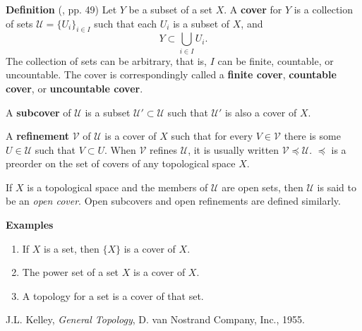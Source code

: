 \documentclass{article}
\begin{document}
{\bf Definition} (\cite{kelley}, pp. 49)
Let $Y$ be a subset of a set $X$. A \textbf{cover} for $Y$ is a collection
of sets $\mathcal{U}=\{U_i\}_{i\in I}$ such that each $U_i$ 
is a subset of $X$, and 
$$ Y \subset \bigcup_{i\in I} U_i.$$
The collection of sets can be arbitrary, that is, $I$ can be 
finite, countable, or uncountable. The cover is  correspondingly called a 
\textbf{finite cover}, \textbf{countable cover}, or \textbf{uncountable cover}.


A \textbf{subcover} of $\mathcal{U}$ is a subset $\mathcal{U}'\subset\mathcal{U}$ such that $\mathcal{U}'$ is also a cover of $X$.

A \textbf{refinement} $\mathcal{V}$ of $\mathcal{U}$ is a cover of $X$ such that for every $V\in\mathcal{V}$ there is some $U\in\mathcal{U}$ such that $V\subset U$.  When $\mathcal{V}$ refines $\mathcal{U}$, it is usually written $\mathcal{V}\preceq \mathcal{U}$.  $\preceq$ is a preorder on the set of covers of any topological space $X$.

If $X$ is a topological space and the members of $\mathcal{U}$ are open sets,
then $\mathcal{U}$ is said to be an \emph{open cover}.
Open subcovers and open refinements are defined similarly.

{\bf Examples}
\begin{enumerate}
\item If $X$ is a set, then $\{X\}$ is a cover of $X$. 
\item The power set of a set $X$ is a cover of $X$.
\item A topology for a set is a cover of that set.
\end{enumerate}


\begin{thebibliography}{9}
  J.L. Kelley, \emph{General Topology},
 D. van Nostrand Company, Inc., 1955.
 \end{thebibliography}
\end{document}
